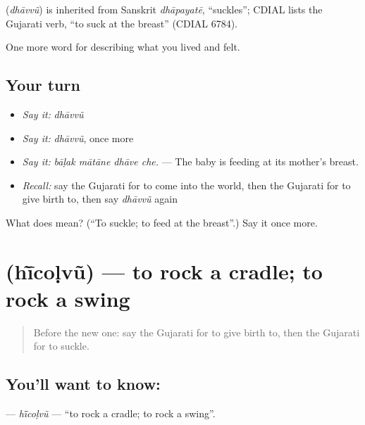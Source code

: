 \begin{cousinweb}
\textbf{} (\emph{dhāvvũ}) is inherited from Sanskrit \emph{dhāpayatē}, \textquotedblleft{}suckles\textquotedblright{}; CDIAL lists the Gujarati verb, \textquotedblleft{}to suck at the breast\textquotedblright{} (CDIAL 6784).
\end{cousinweb}

\begin{grammarlens}[title={What you've built}]
One more word for describing what you lived and felt.
\end{grammarlens}

\subsection*{Your turn}
\begin{itemize}
\raggedright
  \item \emph{Say it:} \emph{dhāvvũ}
  \item \emph{Say it:} \emph{dhāvvũ}, once more
  \item \emph{Say it:} \emph{bāḷak mātāne dhāve che.} — The baby is feeding at its mother's breast.
  \item \emph{Recall:} say the Gujarati for to come into the world, then the Gujarati for to give birth to, then say \emph{dhāvvũ} again
\end{itemize}

\begin{tcolorbox}[breakable,colback=teal!4,colframe=teal!35!black,title={Before you move on}]
What does  mean? (\textquotedblleft{}To suckle; to feed at the breast\textquotedblright{}.) Say it once more.
\end{tcolorbox}
\section[\texorpdfstring{\gu{હીંચોળવું} (hī̃coḷvũ)}{હીંચોળવું (hī̃coḷvũ)}]{ (hī̃coḷvũ) — to rock a cradle; to rock a swing}

\label{lesson:GU-C496-hicolvu}



\begin{quote}
Before the new one: say the Gujarati for to give birth to, then the Gujarati for to suckle.
\end{quote}

\subsection*{You'll want to know: }
\textbf{} — \emph{hī̃coḷvũ} — \textquotedblleft{}to rock a cradle; to rock a swing\textquotedblright{}.

